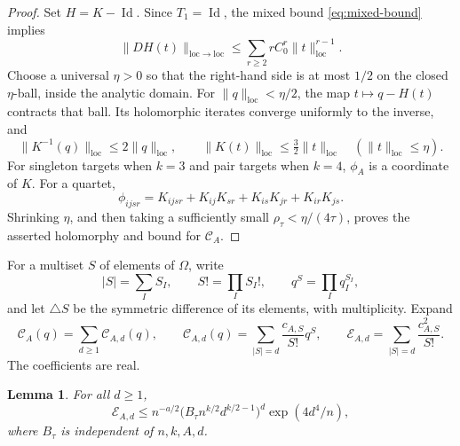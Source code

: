 \documentclass[11pt]{article}
\newtheorem{lemma}{Lemma}
\newcommand{\loc}{\mathrm{loc}}
\DeclareMathOperator{\Id}{Id}
\begin{document}
\begin{proof}
Set \(H=K-\Id\).
Since \(T_1=\Id\), the mixed bound \eqref{eq:mixed-bound} implies
\begin{equation}\label{eq:derivative-bound}
\|DH(t)\|_{\loc\to\loc}
\le\sum_{r\ge2}rC_0^r\|t\|_{\loc}^{r-1}.
\end{equation}
Choose a universal \(\eta>0\) so that the right-hand side is at most \(1/2\) on the closed \(\eta\)-ball, inside the analytic domain.
For \(\|q\|_{\loc}<\eta/2\), the map \(t\mapsto q-H(t)\) contracts that ball.
Its holomorphic iterates converge uniformly to the inverse, and
\begin{equation}\label{eq:inverse-bound}
\|K^{-1}(q)\|_{\loc}\le2\|q\|_{\loc},
\qquad
\|K(t)\|_{\loc}\le\tfrac32\|t\|_{\loc}
\quad(\|t\|_{\loc}\le\eta).
\end{equation}
For singleton targets when \(k=3\) and pair targets when \(k=4\), \(\phi_A\) is a coordinate of \(K\).
For a quartet,
\[
\phi_{ijsr}
=K_{ijsr}+K_{ij}K_{sr}
+K_{is}K_{jr}+K_{ir}K_{js}.
\]
Shrinking \(\eta\), and then taking a sufficiently small \(\rho_\tau<\eta/(4\tau)\), proves the asserted holomorphy and bound for \(\mathcal C_A\).
\end{proof}

For a multiset \(S\) of elements of \(\Omega\), write
\[
|S|=\sum_I S_I,\qquad S!=\prod_I S_I!,\qquad
q^S=\prod_Iq_I^{S_I},
\]
and let \(\triangle S\) be the symmetric difference of its elements, with multiplicity.
Expand
\begin{equation}\label{eq:energy-definition}
\mathcal C_A(q)=\sum_{d\ge1}\mathcal C_{A,d}(q),
\qquad
\mathcal C_{A,d}(q)=\sum_{|S|=d}\frac{c_{A,S}}{S!}q^S,
\qquad
\mathcal E_{A,d}=\sum_{|S|=d}\frac{c_{A,S}^2}{S!}.
\end{equation}
The coefficients are real.

\begin{lemma}\label{lem:coefficients}
For all \(d\ge1\),
\begin{equation}\label{eq:energy-bound}
\mathcal E_{A,d}
\le n^{-a/2}
\bigl(B_\tau n^{k/2}d^{k/2-1}\bigr)^d
\exp(4d^4/n),
\end{equation}
where \(B_\tau\) is independent of \(n,k,A,d\).
\end{lemma}
\end{document}
